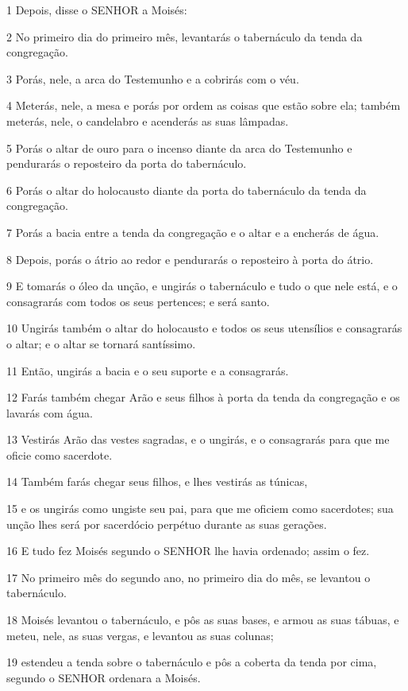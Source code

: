 \par 1 Depois, disse o SENHOR a Moisés:
\par 2 No primeiro dia do primeiro mês, levantarás o tabernáculo da tenda da congregação.
\par 3 Porás, nele, a arca do Testemunho e a cobrirás com o véu.
\par 4 Meterás, nele, a mesa e porás por ordem as coisas que estão sobre ela; também meterás, nele, o candelabro e acenderás as suas lâmpadas.
\par 5 Porás o altar de ouro para o incenso diante da arca do Testemunho e pendurarás o reposteiro da porta do tabernáculo.
\par 6 Porás o altar do holocausto diante da porta do tabernáculo da tenda da congregação.
\par 7 Porás a bacia entre a tenda da congregação e o altar e a encherás de água.
\par 8 Depois, porás o átrio ao redor e pendurarás o reposteiro à porta do átrio.
\par 9 E tomarás o óleo da unção, e ungirás o tabernáculo e tudo o que nele está, e o consagrarás com todos os seus pertences; e será santo.
\par 10 Ungirás também o altar do holocausto e todos os seus utensílios e consagrarás o altar; e o altar se tornará santíssimo.
\par 11 Então, ungirás a bacia e o seu suporte e a consagrarás.
\par 12 Farás também chegar Arão e seus filhos à porta da tenda da congregação e os lavarás com água.
\par 13 Vestirás Arão das vestes sagradas, e o ungirás, e o consagrarás para que me oficie como sacerdote.
\par 14 Também farás chegar seus filhos, e lhes vestirás as túnicas,
\par 15 e os ungirás como ungiste seu pai, para que me oficiem como sacerdotes; sua unção lhes será por sacerdócio perpétuo durante as suas gerações.
\par 16 E tudo fez Moisés segundo o SENHOR lhe havia ordenado; assim o fez.
\par 17 No primeiro mês do segundo ano, no primeiro dia do mês, se levantou o tabernáculo.
\par 18 Moisés levantou o tabernáculo, e pôs as suas bases, e armou as suas tábuas, e meteu, nele, as suas vergas, e levantou as suas colunas;
\par 19 estendeu a tenda sobre o tabernáculo e pôs a coberta da tenda por cima, segundo o SENHOR ordenara a Moisés.
